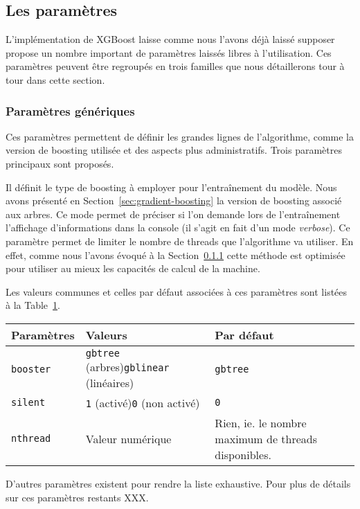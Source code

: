 \subsection{Les paramètres}
L'implémentation de XGBoost laisse comme nous l'avons déjà laissé supposer propose un nombre important de paramètres laissés libres à l'utilisation. Ces paramètres peuvent être regroupés en trois familles que nous détaillerons tour à tour dans cette section.
\subsubsection{Paramètres génériques}
Ces paramètres permettent de définir les grandes lignes de l'algorithme, comme la version de boosting utilisée et des aspects plus \og administratifs\fg. Trois paramètres principaux sont proposés.

Il définit le type de boosting à employer pour l'entraînement du modèle. Nous avons présenté en Section~\ref{sec:gradient-boosting} la version de boosting associé aux arbres.
Ce mode permet de préciser si l'on demande lors de l'entraînement l'affichage d'informations dans la console (il s'agit en fait d'un mode \textit{verbose}).
Ce paramètre permet de limiter le nombre de threads que l'algorithme va utiliser. En effet, comme nous l'avons évoqué à la Section~\ref{} cette méthode est optimisée pour utiliser au mieux les capacités de calcul de la machine.

Les valeurs communes et celles par défaut associées à ces paramètres sont listées à la Table~\ref{tab:params-generiques}.

\begin{table}[h]
  \begin{margincap}
    \centering
    \begin{tabular}[\margincapalign]{p{}p{}p{}}
	\toprule
	\textbf{Paramètres}& \textbf{Valeurs} & \textbf{Par défaut} \\
	\midrule
	\texttt{booster}  & \texttt{gbtree} (arbres)\newline\texttt{gblinear} (linéaires) & \texttt{gbtree} \\
	\texttt{silent}   & \texttt{1} (activé)\newline\texttt{0} (non activé)& \texttt{0}\\
	\texttt{nthread}  & Valeur numérique & Rien, ie. le nombre maximum de threads disponibles. \\
	\bottomrule
    \end{tabular}
	\label{tab:params-generiques}
  \end{margincap}
\end{table}
D'autres paramètres existent pour rendre la liste exhaustive. Pour plus de détails sur ces paramètres restants XXX.


